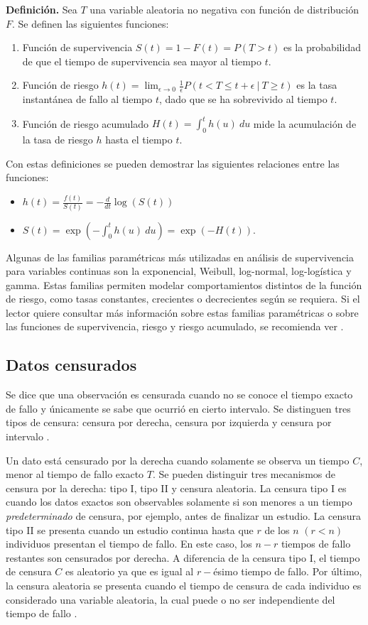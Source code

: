 \documentclass[11pt,a4paper]{article}
\begin{document}
\textbf{Definición.} Sea $T$ una variable aleatoria no negativa con función de distribución $F$. Se definen las siguientes funciones:
\begin{enumerate}
\item Función de supervivencia $S(t) = 1-F(t) = P\left( T > t \right)$ es la probabilidad de que el tiempo de supervivencia sea mayor al tiempo $t$.
\item Función de riesgo $h(t) = \lim_{\epsilon \to 0} \frac{1}{\epsilon}P\left( t<T\leq t+\epsilon \ | \ T \geq t \right)$  es la tasa instantánea de fallo al tiempo $t$, dado que se ha sobrevivido al tiempo $t$.
\item Función de riesgo acumulado $H(t) = \int_0^t h(u) \ du$ mide la acumulación de la tasa de riesgo $h$ hasta el tiempo $t$.
\end{enumerate}
Con estas definiciones se pueden demostrar las siguientes relaciones entre las funciones:
\begin{itemize}
\item $h(t) = \frac{f(t)}{S(t)} = -\frac{d}{dt}\log(S(t))$
\item $S(t) = \exp \left(-\int_0^t h(u) \ du\right) = \exp(-H(t)).$
\end{itemize}

Algunas de las familias paramétricas más utilizadas en análisis de supervivencia para variables continuas son la exponencial, Weibull, log-normal, log-logística y gamma. Estas familias permiten modelar comportamientos distintos de la función de riesgo, como tasas constantes, crecientes o decrecientes según se requiera. Si el lector quiere consultar más información sobre estas familias paramétricas o sobre las funciones de supervivencia, riesgo y riesgo acumulado, se recomienda ver \citet{klein}.

\subsection{Datos censurados}

Se dice que una observación es censurada cuando no se conoce el tiempo exacto de fallo y únicamente se sabe que ocurrió en cierto intervalo. Se distinguen tres tipos de censura: censura por derecha, censura por izquierda y censura por intervalo \citep{klein}.

Un dato está censurado por la derecha cuando solamente se observa un tiempo $C$, menor al tiempo de fallo exacto $T$. Se pueden distinguir tres mecanismos de censura por la derecha: tipo I, tipo II y censura aleatoria. La censura tipo I es cuando los datos exactos son observables solamente si son menores a un tiempo \textit{predeterminado} de censura, por ejemplo, antes de finalizar un estudio. La censura tipo II se presenta cuando un estudio continua hasta que $r$ de los $n$ $(r<n)$ individuos presentan el tiempo de fallo. En este caso, los $n-r$ tiempos de fallo restantes son censurados por derecha. A diferencia de la censura tipo I, el tiempo de censura $C$ es aleatorio ya que es igual al $r-$ésimo tiempo de fallo. Por último, la censura aleatoria se presenta cuando el tiempo de censura de cada individuo es considerado una variable aleatoria, la cual puede o no ser independiente del tiempo de fallo \citep{klein}.
\end{document}
